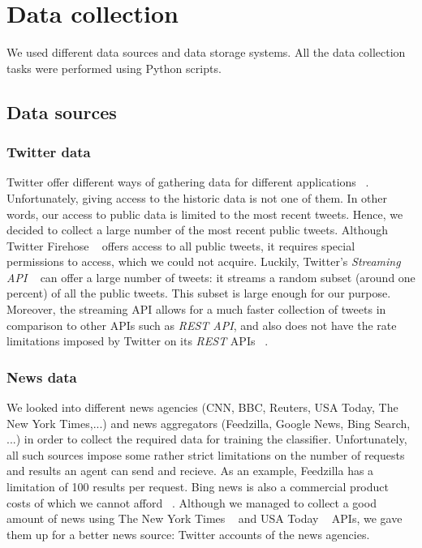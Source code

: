 \documentclass{llncs}
\begin{document}
\section{Data collection}
We used different data sources and data storage systems. All the data collection tasks were performed using Python scripts.
\subsection{Data sources}
\subsubsection{Twitter data}
Twitter offer different ways of gathering data for different applications ~\cite{twitterdocumentation}. Unfortunately, giving access to the historic data is not one of them. In other words, our access to public data is limited to the most recent tweets. Hence, we decided to collect a large number of the most recent public tweets. 
Although Twitter Firehose ~\cite{twitterrestapi} offers access to all public tweets, it requires special permissions to access, which we could not acquire. Luckily, Twitter's \textit{Streaming API} ~\cite{twitterstreaming} can offer a large number of tweets: it streams a random subset (around one percent) of all the public tweets. This subset is large enough for our purpose. Moreover, the streaming API allows for a much faster collection of tweets in comparison to other APIs such as \textit{REST API}, and also does not have the rate limitations imposed by Twitter on its \textit{REST} APIs ~\cite{twitterdocumentation}. 


\subsubsection{News data}
We looked into different news agencies (CNN, BBC, Reuters, USA Today, The New York Times,...) and news aggregators (Feedzilla, Google News, Bing Search, ...) in order to collect the required data for training the classifier. Unfortunately, all such sources impose some rather strict limitations on the number of requests and results an agent can send and recieve. As an example, Feedzilla has a limitation of 100 results per request. Bing news is also a commercial product costs of which we cannot afford ~\cite{bingsearchapi}. Although we managed to collect a good amount of news using The New York Times ~\cite{thenytimes} and USA Today ~\cite{thenytimes} APIs, we gave them up for a better news source: Twitter accounts of the news agencies. 
\end{document}
